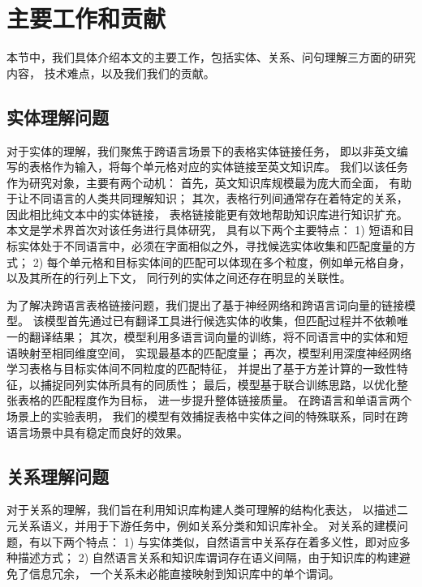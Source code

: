 
\section{主要工作和贡献}

本节中，我们具体介绍本文的主要工作，包括实体、关系、问句理解三方面的研究内容，
技术难点，以及我们我们的贡献。


\subsection{实体理解问题}

对于实体的理解，我们聚焦于跨语言场景下的表格实体链接任务，
即以非英文编写的表格作为输入，将每个单元格对应的实体链接至英文知识库。
我们以该任务作为研究对象，主要有两个动机：
首先，英文知识库规模最为庞大而全面，%
有助于让不同语言的人类共同理解知识；
其次，表格行列间通常存在着特定的关系，因此相比纯文本中的实体链接，
表格链接能更有效地帮助知识库进行知识扩充。
本文是学术界首次对该任务进行具体研究，
具有以下两个主要特点：
1) 短语和目标实体处于不同语言中，必须在字面相似之外，寻找候选实体收集和匹配度量的方式；
2) 每个单元格和目标实体间的匹配可以体现在多个粒度，例如单元格自身，以及其所在的行列上下文，
同行列的实体之间还存在明显的关联性。

为了解决跨语言表格链接问题，我们提出了基于神经网络和跨语言词向量的链接模型。
该模型首先通过已有翻译工具进行候选实体的收集，但匹配过程并不依赖唯一的翻译结果；
其次，模型利用多语言词向量的训练，将不同语言中的实体和短语映射至相同维度空间，
实现最基本的匹配度量；
再次，模型利用深度神经网络学习表格与目标实体间不同粒度的匹配特征，
并提出了基于方差计算的一致性特征，以捕捉同列实体所具有的同质性；
最后，模型基于联合训练思路，以优化整张表格的匹配程度作为目标，
进一步提升整体链接质量。
在跨语言和单语言两个场景上的实验表明，
我们的模型有效捕捉表格中实体之间的特殊联系，同时在跨语言场景中具有稳定而良好的效果。

\subsection{关系理解问题}

对于关系的理解，我们旨在利用知识库构建人类可理解的结构化表达，
以描述二元关系语义，并用于下游任务中，例如关系分类和知识库补全。
对关系的建模问题，有以下两个特点：
1) 与实体类似，自然语言中关系存在着多义性，即对应多种描述方式；
2) 自然语言关系和知识库谓词存在语义间隔，由于知识库的构建避免了信息冗余，
一个关系未必能直接映射到知识库中的单个谓词。

